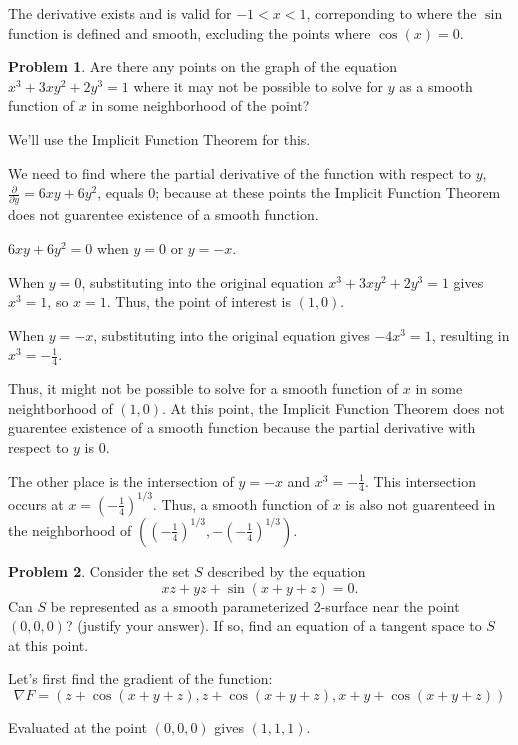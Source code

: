 \documentclass[12]{amsart}
\theoremstyle{definition}
\newtheorem{xca}{Problem}
\newcommand{\sskip}{\newpage}
\begin{document}
The derivative exists and is valid for $-1 < x < 1$, correponding to where
the $\sin$ function is defined and smooth, excluding the points where $\cos(x) = 0$.


\sskip
\begin{xca} %
Are there any points on the graph of the equation $x^3+3xy^2+2y^3=1$ where it may not be possible to solve for $y$ as a smooth function of $x$ in some neighborhood of the point?
\end{xca}


We'll use the Implicit Function Theorem for this.

We need to find where the partial derivative of the function with respect to $y$,
$\frac{\partial}{\partial y} = 6xy + 6y^2$, equals $0$;
because at these points the Implicit Function Theorem
does not guarentee existence of a smooth function.

$6xy + 6y^2 = 0$ when $y = 0$ or $y = -x$.

When $y = 0$, substituting into the original equation $x^3 + 3xy^2 + 2y^3 = 1$
gives $x^3 = 1$, so $x = 1$. Thus, the point of interest is $(1, 0)$.

When $y = -x$, substituting into the original equation gives $-4x^3 = 1$,
resulting in $x^3 = -\frac{1}{4}$.

Thus, it might not be possible to solve for a smooth function of $x$
in some neightborhood of $(1, 0)$. At this point, the Implicit Function
Theorem does not guarentee existence of a smooth function because the partial
derivative with respect to $y$ is $0$.

The other place is the intersection of $y = -x$ and $x^3 = -\frac{1}{4}$.
This intersection occurs at $x = \left(-\frac{1}{4}\right)^{1/3}$.
Thus, a smooth function of $x$ is also not guarenteed in the neighborhood
of $(\left(-\frac{1}{4}\right)^{1/3}, -\left(-\frac{1}{4}\right)^{1/3})$.


\sskip
\begin{xca} %
Consider the set $S$ described by the equation
$$
xz+yz+\sin{(x+y+z)}=0.
$$
Can $S$ be represented as a smooth parameterized 2-surface near the point $(0,0,0)$? (justify your answer). If so, find an equation of a tangent space to $S$ at this point.
\end{xca}


Let's first find the gradient of the function:
\[\nabla F = \left(z + \cos(x+y+z), z + \cos(x+y+z), x + y + \cos(x+y+z)\right)\]

Evaluated at the point $(0, 0, 0)$ gives $(1, 1, 1)$.
\end{document}
